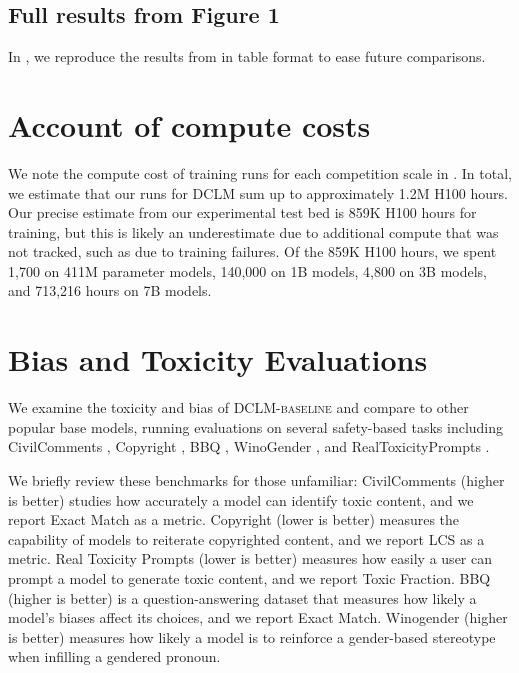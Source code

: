 \documentclass{article}
\newcommand{\dclm}{\textsc{DCLM}\xspace}
\newcommand{\hqpool}{\textsc{DCLM-baseline}\xspace}
\begin{document}
\subsection{Full results from Figure 1}

In , we reproduce the results from  in table format to ease future comparisons.

\begin{table}
    \centering
    \caption{We reproduce the results from Figure 1 (left) in tabular format for ease of reference below.}
    
    \label{tab:fig-1-table-version}
\end{table}

\section{Account of compute costs}\label{appx:compute-cost}

We note the compute cost of training runs for each competition scale in .
In total, we estimate that our runs for \dclm sum up to approximately 1.2M H100 hours. Our precise estimate from our experimental test bed is 859K H100 hours for training, but this is likely an underestimate due to additional compute that was not tracked, such as due to training failures.
Of the 859K H100 hours, we spent 1,700 on 411M parameter models, 140,000 on 1B models, 4,800 on 3B models, and 713,216 hours on 7B models.

\section{Bias and Toxicity Evaluations}\label{appx:toxicity}

We examine the toxicity and bias of \hqpool and compare to other popular base models, running evaluations on several safety-based tasks including CivilComments \citep{borkan2019nuanced}, Copyright \citep{carlini2021extracting}, BBQ \citep{bbq}, WinoGender \citep{winogender}, and  RealToxicityPrompts \citep{gehman2020realtoxicityprompts}.

We briefly review these benchmarks for those unfamiliar: CivilComments (higher is better) studies how accurately a model can identify toxic content, and we report Exact Match as a metric. Copyright (lower is better) measures the capability of models to reiterate copyrighted content, and we report LCS as a metric. Real Toxicity Prompts (lower is better) measures how easily a user can prompt a model to generate toxic content, and we report Toxic Fraction. BBQ (higher is better) is a question-answering dataset that measures how likely a model’s biases affect its choices, and we report Exact Match. Winogender (higher is better) measures how likely a model is to reinforce a gender-based stereotype when infilling a gendered pronoun.
\end{document}
